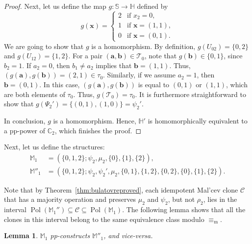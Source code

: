\documentclass[12pt]{amsart}
\newtheorem{lemma}[theorem]{Lemma}
\theoremstyle{definition}
\theoremstyle{definition}
\newcommand{\struct}[1]{\mathbb{#1}}
\DeclareMathOperator{\Pol}{Pol}
\newcommand{\minorequivalentto}{\equiv_{\mathrm{m}}}
\begin{document}
\begin{proof}
Next, let us define the map $g \colon \mathbb S \to \mathbb H$ defined by $$g(\boldsymbol{x}) = \begin{cases} 2 &\text{if } x_2 = 0,\\
1 &\text{if } \boldsymbol{x} = (1,1),\\
0 &\text{if } \boldsymbol{x} = (0,1).
\end{cases}$$
We are going to show that $g$ is a homomorphism. By definition, $g(U_{02}) = \{0,2\}$ and $g(U_{12}) = \{1,2\}$. For a pair $(\boldsymbol{a},\boldsymbol{b}) \in \mathcal T_0$, note that $g(\boldsymbol{b}) \in \{0,1\}$, since $b_2=1$. If $a_2 = 0$, then $b_1\neq a_2$ implies that  $\boldsymbol{b}=(1,1)$. Thus, $(g(\boldsymbol{a}),g(\boldsymbol{b})) = (2,1) \in \tau_0$. Similarly, if we assume $a_2 = 1$, then $\boldsymbol{b}=(0,1)$. In this case, $(g(\boldsymbol{a}),g(\boldsymbol{b}))$ is equal to $(0,1)$ or $(1,1)$, which are both elements of $\tau_0$. Thus, $g(\mathcal T_0) = \tau_0$. It is furthermore straightforward to show that 
$g(\Psi_2') = \{(0,1),(1,0)\} = \psi_2'$. 

In conclusion, $g$ is a homomorphism. Hence, $\mathbb H'$ is homomorphically equivalent to a pp-power of $\mathbb C_2$, which finishes the proof.
\end{proof}

Next, let us define the structures: 
\begin{align*}
\struct{M}_1 &= (\{0,1,2\};\psi_2,\mu_2,\{0\},\{1\},\{2\}),\\
\struct{M}''_1 &= (\{0,1,2\};\psi_2,\psi_2',\mu_2,\{0,1\},\{1,2\},\{0,2\},\{0\},\{1\},\{2\}).
\end{align*}

Note that by Theorem~\ref{thm:bulatovreproved},
each idempotent Mal'cev clone $\mathcal C$ that has a majority operation
and preserves $\mu_2$ and $\psi_2$, 
but not $\rho_2$, lies in the interval 
$\Pol(\struct{M}_1'') \subseteq \mathcal C \subseteq \Pol(\struct{M}_1)$. 
The following lemma shows that all the clones in this interval belong to the same equivalence class 
modulo $\minorequivalentto$. 

\begin{lemma} \label{lemma:extensionm1}
$\struct{M}_1$ pp-constructs $\struct{M}''_1$, and vice-versa.
\end{lemma}
\end{document}
